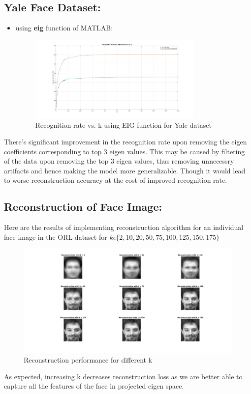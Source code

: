 \documentclass{article}
\begin{document}
\begin{enumerate}
\subsection{Yale Face Dataset:}
\begin{itemize}
        \item using \textbf{eig} function of MATLAB:\\
        \begin{figure}[H]
            \centering
            \includegraphics[width=0.8\textwidth]{../images/Yale_dataset_Recognition_Rates_for_diff_k.jpg}
            \caption{Recognition rate vs. k using EIG function for Yale dataset}
        \end{figure}
    \end{itemize}
There's significant improvement in the recognition rate upon removing the eigen coefficients corresponding to top 3 eigen values.
This may be caused by filtering of the data upon removing the top 3 eigen values, thus removing unnecessry artifacts and hence making the model more generalizable. Though it would lead to worse reconstruction accuracy at the cost of improved recognition rate.
\newpage
\subsection{Reconstruction of Face Image:}
Here are the results of implementing reconstruction algorithm for an individual face image in the ORL dataset for $k \epsilon \{2, 10, 20, 50, 75, 100, 125, 150, 175\}$
\begin{figure}[H]
    \centering
    \includegraphics[width=1\linewidth]{../images/Reconstruction_for_different_k.jpg}
    \caption{Reconstruction performance for different k}
    \label{fig:enter-label}
\end{figure}
As expected, increasing k decreases reconstruction loss as we are better able to capture all the features of the face in projected eigen space.\\

\end{enumerate}
\end{document}
